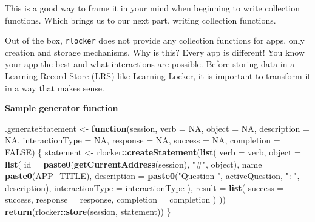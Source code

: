 \documentclass[
]{book}
\newenvironment{Shaded}{\begin{snugshade}}{\end{snugshade}}
\newcommand{\ControlFlowTok}[1]{\textcolor[rgb]{0.13,0.29,0.53}{\textbf{#1}}}
\newcommand{\DataTypeTok}[1]{\textcolor[rgb]{0.13,0.29,0.53}{#1}}
\newcommand{\KeywordTok}[1]{\textcolor[rgb]{0.13,0.29,0.53}{\textbf{#1}}}
\newcommand{\NormalTok}[1]{#1}
\newcommand{\OperatorTok}[1]{\textcolor[rgb]{0.81,0.36,0.00}{\textbf{#1}}}
\newcommand{\OtherTok}[1]{\textcolor[rgb]{0.56,0.35,0.01}{#1}}
\newcommand{\StringTok}[1]{\textcolor[rgb]{0.31,0.60,0.02}{#1}}
\begin{document}
This is a good way to frame it in your mind when beginning to write collection functions. Which brings us to our next part, writing collection functions.

Out of the box, \texttt{rlocker} does not provide any collection functions for apps, only creation and storage mechanisms. Why is this? Every app is different! You know your app the best and what interactions are possible. Before storing data in a Learning Record Store (LRS) like \href{https://www.ht2labs.com/learning-locker-community/overview/}{Learning Locker}, it is important to transform it in a way that makes sense.

\textbf{Sample generator function}

\begin{Shaded}
\begin{Highlighting}[]
\NormalTok{.generateStatement <-}\StringTok{ }\ControlFlowTok{function}\NormalTok{(session, }\DataTypeTok{verb =} \OtherTok{NA}\NormalTok{, }\DataTypeTok{object =} \OtherTok{NA}\NormalTok{, }\DataTypeTok{description =} \OtherTok{NA}\NormalTok{,}
                               \DataTypeTok{interactionType =} \OtherTok{NA}\NormalTok{, }\DataTypeTok{response =} \OtherTok{NA}\NormalTok{, }\DataTypeTok{success =} \OtherTok{NA}\NormalTok{,}
                               \DataTypeTok{completion =} \OtherTok{FALSE}\NormalTok{) \{}
\NormalTok{  statement <-}\StringTok{ }\NormalTok{rlocker}\OperatorTok{::}\KeywordTok{createStatement}\NormalTok{(}\KeywordTok{list}\NormalTok{(}
    \DataTypeTok{verb =}\NormalTok{ verb,}
    \DataTypeTok{object =} \KeywordTok{list}\NormalTok{(}
      \DataTypeTok{id =} \KeywordTok{paste0}\NormalTok{(}\KeywordTok{getCurrentAddress}\NormalTok{(session), }\StringTok{"#"}\NormalTok{, object),}
      \DataTypeTok{name =} \KeywordTok{paste0}\NormalTok{(APP_TITLE),}
      \DataTypeTok{description =} \KeywordTok{paste0}\NormalTok{(}\StringTok{"Question "}\NormalTok{, activeQuestion, }\StringTok{": "}\NormalTok{, description),}
      \DataTypeTok{interactionType =}\NormalTok{ interactionType}
\NormalTok{    ),}
    \DataTypeTok{result =} \KeywordTok{list}\NormalTok{(}
      \DataTypeTok{success =}\NormalTok{ success,}
      \DataTypeTok{response =}\NormalTok{ response,}
      \DataTypeTok{completion =}\NormalTok{ completion}
\NormalTok{    )}
\NormalTok{  ))}
  \KeywordTok{return}\NormalTok{(rlocker}\OperatorTok{::}\KeywordTok{store}\NormalTok{(session, statement))   }
\NormalTok{\}}
\end{Highlighting}
\end{Shaded}
\end{document}
